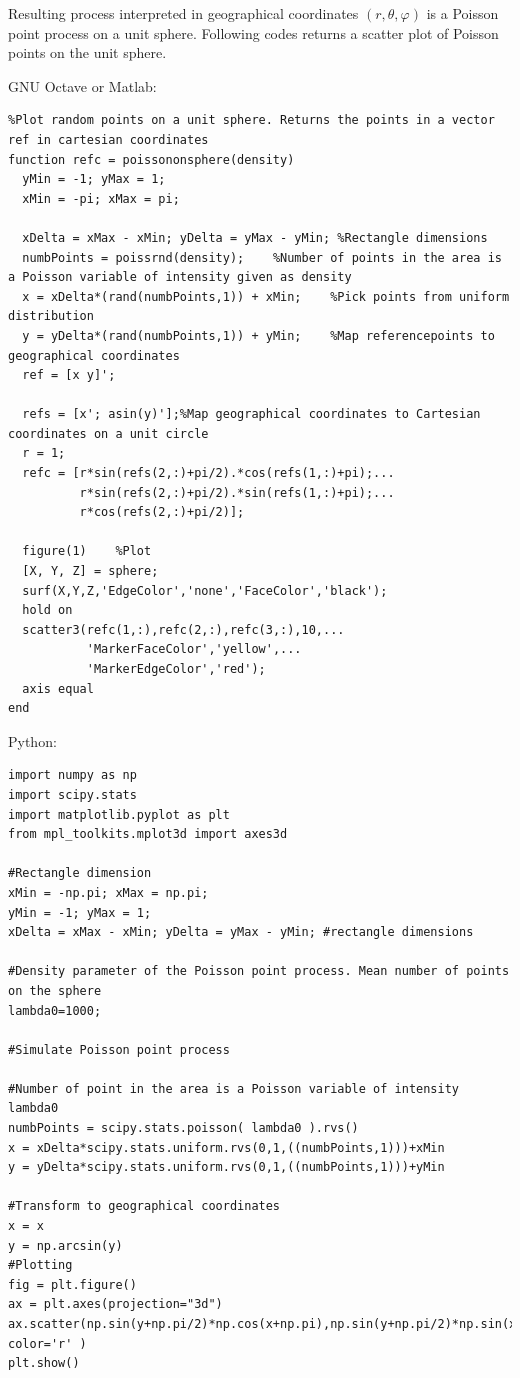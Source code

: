 \documentclass{article}
\begin{document}
        Resulting process interpreted in geographical coordinates $(r,\theta,\varphi)$ is a Poisson point process on a unit sphere.  Following codes returns a scatter plot of Poisson points on the unit sphere.



        GNU Octave or Matlab:
\begin{verbatim}
%Plot random points on a unit sphere. Returns the points in a vector ref in cartesian coordinates
function refc = poissononsphere(density)
  yMin = -1; yMax = 1;
  xMin = -pi; xMax = pi;
  
  xDelta = xMax - xMin; yDelta = yMax - yMin; %Rectangle dimensions
  numbPoints = poissrnd(density);    %Number of points in the area is a Poisson variable of intensity given as density
  x = xDelta*(rand(numbPoints,1)) + xMin;    %Pick points from uniform distribution
  y = yDelta*(rand(numbPoints,1)) + yMin;    %Map referencepoints to geographical coordinates
  ref = [x y]';

  refs = [x'; asin(y)'];%Map geographical coordinates to Cartesian coordinates on a unit circle
  r = 1;
  refc = [r*sin(refs(2,:)+pi/2).*cos(refs(1,:)+pi);...
          r*sin(refs(2,:)+pi/2).*sin(refs(1,:)+pi);...
          r*cos(refs(2,:)+pi/2)];

  figure(1)    %Plot
  [X, Y, Z] = sphere;
  surf(X,Y,Z,'EdgeColor','none','FaceColor','black');
  hold on
  scatter3(refc(1,:),refc(2,:),refc(3,:),10,...
           'MarkerFaceColor','yellow',...
           'MarkerEdgeColor','red');
  axis equal
end
\end{verbatim}

Python:

\begin{verbatim}
import numpy as np
import scipy.stats
import matplotlib.pyplot as plt
from mpl_toolkits.mplot3d import axes3d

#Rectangle dimension
xMin = -np.pi; xMax = np.pi;
yMin = -1; yMax = 1;
xDelta = xMax - xMin; yDelta = yMax - yMin; #rectangle dimensions

#Density parameter of the Poisson point process. Mean number of points on the sphere
lambda0=1000; 

#Simulate Poisson point process

#Number of point in the area is a Poisson variable of intensity lambda0
numbPoints = scipy.stats.poisson( lambda0 ).rvs()
x = xDelta*scipy.stats.uniform.rvs(0,1,((numbPoints,1)))+xMin
y = yDelta*scipy.stats.uniform.rvs(0,1,((numbPoints,1)))+yMin

#Transform to geographical coordinates
x = x
y = np.arcsin(y)
#Plotting
fig = plt.figure()
ax = plt.axes(projection="3d")
ax.scatter(np.sin(y+np.pi/2)*np.cos(x+np.pi),np.sin(y+np.pi/2)*np.sin(x+np.pi),np.cos(y+np.pi/2), color='r' )
plt.show()

\end{verbatim}
\end{document}
